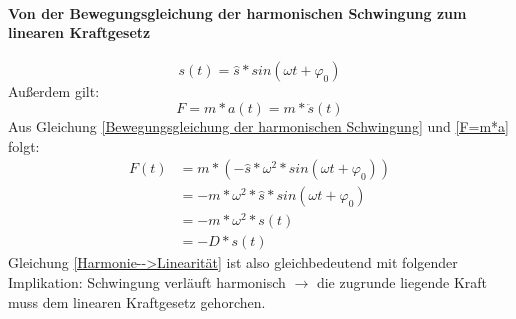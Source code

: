 \documentclass[12 pt]{article}
\numberwithin{equation}{section}
\begin{document}
	\paragraph{Von der Bewegungsgleichung der harmonischen Schwingung zum linearen Kraftgesetz}
	\begin{equation}\label{Bewegungsgleichung der harmonischen Schwingung}
		s(t)=\hat{s}*sin(\omega t+\varphi_{0})
	\end{equation}
	Außerdem gilt:
	\begin{equation}\label{F=m*a}
		F=m*a(t)=m*\ddot{s}(t)
	\end{equation}
	Aus Gleichung \ref{Bewegungsgleichung der harmonischen Schwingung} und \ref{F=m*a} folgt:
	\begin{subequations}
		\begin{align}\label{Harmonie-->Linearität}
			F(t) &=m*(-\hat{s}*\omega^{2}*sin(\omega t+\varphi_{0}))\\
			&= -m*\omega^{2}*\hat{s}*sin(\omega t+\varphi_{0})\\
			&= -m*\omega^{2}*s(t)\\
			&= -D*s(t)
		\end{align}
	\end{subequations}
	Gleichung \ref{Harmonie-->Linearität} ist also gleichbedeutend mit folgender Implikation:\newline
	Schwingung verläuft harmonisch $\rightarrow$ die zugrunde liegende Kraft muss dem linearen Kraftgesetz gehorchen.
\end{document}
